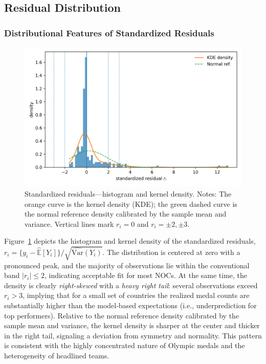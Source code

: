 \documentclass[11pt,twoside]{article}
\numberwithin{Theorem}{section}
\numberwithin{Definition}{section}
\numberwithin{Lemma}{section}
\numberwithin{Algorithm}{section}
\numberwithin{equation}{section}
\begin{document}
\subsection{Residual Distribution}
\subsubsection{Distributional Features of Standardized Residuals}
\begin{figure}[H]
  \centering
  \includegraphics[width=0.92\linewidth]{fig_resid_hist.png}
  \caption{Standardized residuals—histogram and kernel density.
  Notes: The orange curve is the kernel density (KDE); the green dashed curve is the
  normal reference density calibrated by the sample mean and variance. Vertical
  lines mark $r_i=0$ and $r_i=\pm2,\pm3$.}
  \label{fig:resid_hist}
\end{figure}

Figure~\ref{fig:resid_hist} depicts the histogram and kernel density of the standardized
residuals, $r_i=\{y_i-\widehat{\mathbb{E}}[Y_i]\}/\sqrt{\widehat{\mathrm{Var}}(Y_i)}$.
The distribution is centered at zero with a pronounced peak, and the majority of
observations lie within the conventional band $|r_i|\leq2$, indicating acceptable fit
for most NOCs. At the same time, the density is clearly \emph{right-skewed} with a
\emph{heavy right tail}: several observations exceed $r_i>3$, implying that for a small
set of countries the realized medal counts are substantially higher than the model-based
expectations (i.e., underprediction for top performers). Relative to the normal reference
density calibrated by the sample mean and variance, the kernel density is sharper at the
center and thicker in the right tail, signaling a deviation from symmetry and normality.
This pattern is consistent with the highly concentrated nature of Olympic medals and the
heterogeneity of headlined teams.
\end{document}
